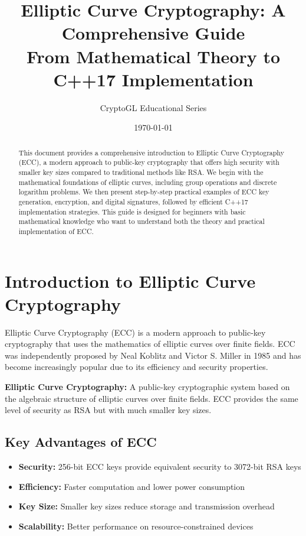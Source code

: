 \documentclass[11pt,a4paper]{article}
\title{\Huge\textbf{Elliptic Curve Cryptography: A Comprehensive Guide}\\[0.5cm]
\large From Mathematical Theory to C++17 Implementation}
\author{CryptoGL Educational Series}
\date{\today}
\begin{document}
\maketitle

\begin{abstract}
This document provides a comprehensive introduction to Elliptic Curve Cryptography (ECC), a modern approach to public-key cryptography that offers high security with smaller key sizes compared to traditional methods like RSA. We begin with the mathematical foundations of elliptic curves, including group operations and discrete logarithm problems. We then present step-by-step practical examples of ECC key generation, encryption, and digital signatures, followed by efficient C++17 implementation strategies. This guide is designed for beginners with basic mathematical knowledge who want to understand both the theory and practical implementation of ECC.
\end{abstract}

\tableofcontents
\newpage

\section{Introduction to Elliptic Curve Cryptography}

Elliptic Curve Cryptography (ECC) is a modern approach to public-key cryptography that uses the mathematics of elliptic curves over finite fields. ECC was independently proposed by Neal Koblitz and Victor S. Miller in 1985 and has become increasingly popular due to its efficiency and security properties.

\begin{definitionbox}
\textbf{Elliptic Curve Cryptography:} A public-key cryptographic system based on the algebraic structure of elliptic curves over finite fields. ECC provides the same level of security as RSA but with much smaller key sizes.
\end{definitionbox}

\subsection{Key Advantages of ECC}

\begin{itemize}
    \item \textbf{Security:} 256-bit ECC keys provide equivalent security to 3072-bit RSA keys
    \item \textbf{Efficiency:} Faster computation and lower power consumption
    \item \textbf{Key Size:} Smaller key sizes reduce storage and transmission overhead
    \item \textbf{Scalability:} Better performance on resource-constrained devices
\end{itemize}
\end{document}
